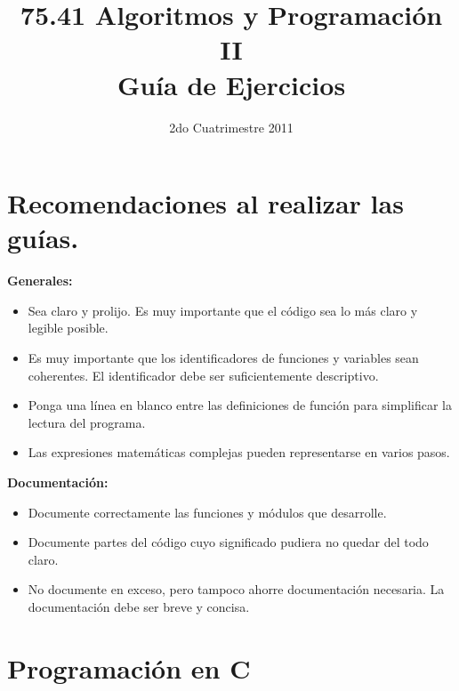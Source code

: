 \documentclass[11pt,a4paper]{article}
\title{75.41 Algoritmos y Programación II \\
    \textbf{Guía de Ejercicios}}
\date{2do Cuatrimestre 2011}
\theoremstyle{definition}
\begin{document}
\maketitle
\thispagestyle{empty}

\newpage

\section*{Recomendaciones al realizar las guías.}

\textbf{Generales:}
\begin{itemize}
	\item Sea claro y prolijo. Es muy importante que el código sea lo más claro y legible posible.
	\item Es muy importante que los identificadores de funciones y variables sean coherentes. El identificador debe ser suficientemente descriptivo.
	\item Ponga una línea en blanco entre las definiciones de función para simplificar la lectura del programa.
	\item Las expresiones matemáticas complejas pueden representarse en varios pasos.
\end{itemize}

\textbf{Documentación:}
\begin{itemize}
	\item Documente correctamente las funciones y módulos que desarrolle.
	\item Documente partes del código cuyo significado pudiera no quedar del todo claro.
	\item No documente en exceso, pero tampoco ahorre documentación necesaria. La documentación debe ser breve y concisa.
\end{itemize}



\newenvironment{partes}
{	\begin{list}{\alph{partesi})}{
		\usecounter{partesi}
		\setlength{\topsep}{0pt}
		\setlength{\itemsep}{0pt}}}
{	\end{list} }

\newpage
\section{Programación en C}
\end{document}
